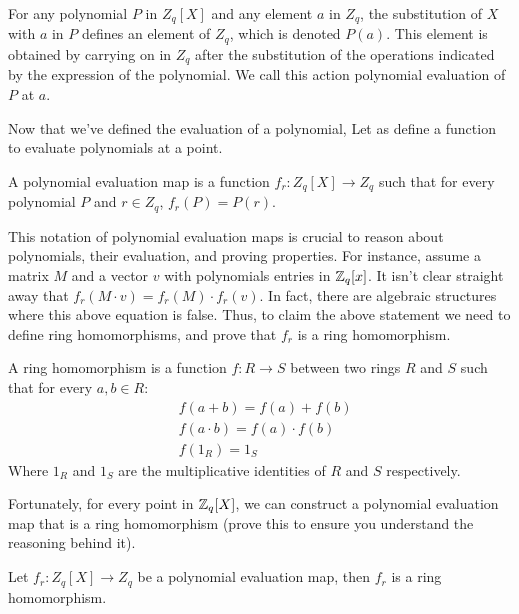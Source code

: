 \begin{definition} \label{def:poly-eval}
  For any polynomial $P$ in $Z_q[X]$ and any element $a$ in $Z_q$,
  the substitution of $X$ with $a$ in $P$ defines an element of $Z_q$, which is denoted $P(a)$.
  This element is obtained by carrying on in $Z_q$ after the substitution of the operations indicated by 
  the expression of the polynomial.
  We call this action polynomial evaluation of $P$ at $a$.
\end{definition}

Now that we've defined the evaluation of a polynomial,
Let as define a function to evaluate polynomials at a point.

\begin{definition}\label{def:poly-eval-map}
  A polynomial evaluation map is a function $f_r:Z_q[X]\to Z_q$ such that for every polynomial $P$ and $r\in Z_q$,
  $f_r(P)=P(r)$.
\end{definition}

This notation of polynomial evaluation maps is crucial to reason about polynomials, their evaluation, 
and proving properties. For instance, assume a matrix $M$ and a vector $v$ with polynomials entries in $\mathbb{Z}_q[x]$.
It isn't clear straight away that $f_r(M\cdot v) = f_r(M)\cdot f_r(v)$. In fact, there are algebraic 
structures where this above equation is false. 
Thus, to claim the above statement we need to define ring homomorphisms, and prove that $f_r$ is a ring homomorphism.

\begin{definition}
  A ring homomorphism is a function $f:R\to S$ between two rings $R$ and $S$ such that for every $a,b\in R$:
  \begin{align}
    &f(a+b)=f(a)+f(b)\\
    &f(a\cdot b)=f(a)\cdot f(b) \\
    &f(1_R)=1_S
  \end{align}
   Where $1_R$ and $1_S$ are the multiplicative identities of $R$ and $S$ respectively.
\end{definition}

Fortunately, for every point in $\mathbb{Z}_q[X]$, we can construct a polynomial evaluation map that is 
a ring homomorphism (prove this to ensure you understand the reasoning behind it).
\begin{theorem}
    Let $f_r:Z_q[X]\to Z_q$ be a polynomial evaluation map, then $f_r$ is a ring homomorphism.
\end{theorem}

